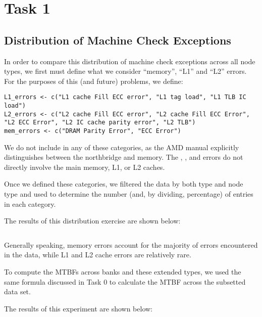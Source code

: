 \section{Task 1}

\subsection{Distribution of Machine Check Exceptions}

In order to compare this distribution of machine check exceptions across all node types, we first must define what we consider ``memory'', ``L1'' and ``L2'' errors.  For the purposes of this (and future) problems, we define:

\begin{verbatim}
L1_errors <- c("L1 cache Fill ECC error", "L1 tag load", "L1 TLB IC load")
L2_errors <- c("L2 cache Fill ECC error", "L2 cache Fill ECC Error", "L2 ECC Error", "L2 IC cache parity error", "L2 TLB")
mem_errors <- c("DRAM Parity Error", "ECC Error")
\end{verbatim}

We do not include  in any of these categories, as the AMD manual explicitly distinguishes between the northbridge and memory.  The , , and  errors do not directly involve the main memory, L1, or L2 caches.

Once we defined these categories, we filtered the data by both type and node type and used  to determine the number (and, by dividing, percentage) of entries in each category.

The results of this distribution exercise are shown below:

\begin{verbatim}

\end{verbatim}

Generally speaking, memory errors account for the majority of errors encountered in the data, while L1 and L2 cache errors are relatively rare.

To compute the MTBFs across banks and these extended types, we used the same formula discussed in Task 0 to calculate the MTBF across the subsetted data set.

The results of this experiment are shown below:

\begin{verbatim}

\end{verbatim}

